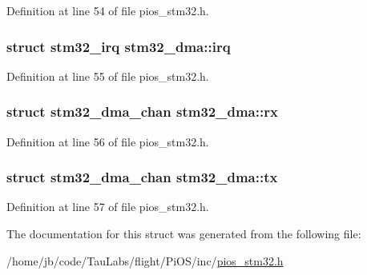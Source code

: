 \-Definition at line 54 of file pios\-\_\-stm32.\-h.

\hypertarget{structstm32__dma_ae18ccde217e150c9de5b55b43d110a9d}{
\subsubsection[{irq}]{\setlength{\rightskip}{0pt plus 5cm}struct {\bf stm32\-\_\-irq} {\bf stm32\-\_\-dma\-::irq}}}\label{structstm32__dma_ae18ccde217e150c9de5b55b43d110a9d}


\-Definition at line 55 of file pios\-\_\-stm32.\-h.

\hypertarget{structstm32__dma_a967c78ffd2d021ac268f1d8c0a2c7e30}{
\subsubsection[{rx}]{\setlength{\rightskip}{0pt plus 5cm}struct {\bf stm32\-\_\-dma\-\_\-chan} {\bf stm32\-\_\-dma\-::rx}}}\label{structstm32__dma_a967c78ffd2d021ac268f1d8c0a2c7e30}


\-Definition at line 56 of file pios\-\_\-stm32.\-h.

\hypertarget{structstm32__dma_a4ef0eab3e87fc579e24c36e51d31b88a}{
\subsubsection[{tx}]{\setlength{\rightskip}{0pt plus 5cm}struct {\bf stm32\-\_\-dma\-\_\-chan} {\bf stm32\-\_\-dma\-::tx}}}\label{structstm32__dma_a4ef0eab3e87fc579e24c36e51d31b88a}


\-Definition at line 57 of file pios\-\_\-stm32.\-h.



\-The documentation for this struct was generated from the following file\-:\begin{DoxyCompactItemize}
\item 
/home/jb/code/\-Tau\-Labs/flight/\-Pi\-O\-S/inc/\hyperlink{pios__stm32_8h}{pios\-\_\-stm32.\-h}\end{DoxyCompactItemize}
